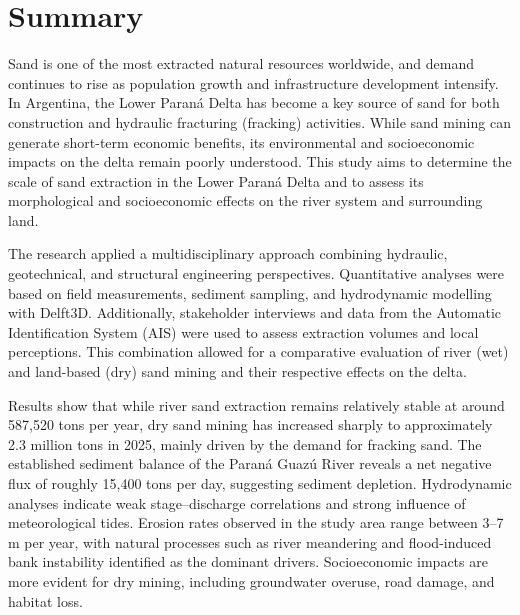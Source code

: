 \chapter*{Summary}
Sand is one of the most extracted natural resources worldwide, and demand continues to rise as population growth and infrastructure development intensify. In Argentina, the Lower Paraná Delta has become a key source of sand for both construction and hydraulic fracturing (fracking) activities. While sand mining can generate short-term economic benefits, its environmental and socioeconomic impacts on the delta remain poorly understood. This study aims to determine the scale of sand extraction in the Lower Paraná Delta and to assess its morphological and socioeconomic effects on the river system and surrounding land.

The research applied a multidisciplinary approach combining hydraulic, geotechnical, and structural engineering perspectives. Quantitative analyses were based on field measurements, sediment sampling, and hydrodynamic modelling with Delft3D. Additionally, stakeholder interviews and data from the Automatic Identification System (AIS) were used to assess extraction volumes and local perceptions. This combination allowed for a comparative evaluation of river (wet) and land-based (dry) sand mining and their respective effects on the delta.

Results show that while river sand extraction remains relatively stable at around 587,520 tons per year, dry sand mining has increased sharply to approximately 2.3 million tons in 2025, mainly driven by the demand for fracking sand. The established sediment balance of the Paraná Guazú River reveals a net negative flux of roughly 15,400 tons per day, suggesting sediment depletion. Hydrodynamic analyses indicate weak stage–discharge correlations and strong influence of meteorological tides. Erosion rates observed in the study area range between 3–7 m per year, with natural processes such as river meandering and flood-induced bank instability identified as the dominant drivers. Socioeconomic impacts are more evident for dry mining, including groundwater overuse, road damage, and habitat loss.